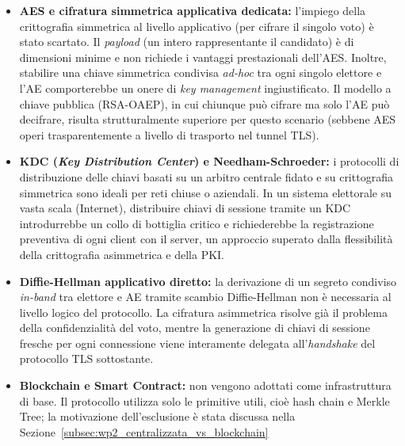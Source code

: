 \begin{itemize}
    \item \textbf{AES e cifratura simmetrica applicativa dedicata:} l'impiego della crittografia simmetrica al livello applicativo (per cifrare il singolo voto) è stato scartato. Il \textit{payload} (un intero rappresentante il candidato) è di dimensioni minime e non richiede i vantaggi prestazionali dell'AES. Inoltre, stabilire una chiave simmetrica condivisa \textit{ad-hoc} tra ogni singolo elettore e l'AE comporterebbe un onere di \textit{key management} ingiustificato. Il modello a chiave pubblica (RSA-OAEP), in cui chiunque può cifrare ma solo l'AE può decifrare, risulta strutturalmente superiore per questo scenario (sebbene AES operi trasparentemente a livello di trasporto nel tunnel TLS).
    \item \textbf{KDC (\textit{Key Distribution Center}) e Needham-Schroeder:} i protocolli di distribuzione delle chiavi basati su un arbitro centrale fidato e su crittografia simmetrica sono ideali per reti chiuse o aziendali. In un sistema elettorale su vasta scala (Internet), distribuire chiavi di sessione tramite un KDC introdurrebbe un collo di bottiglia critico e richiederebbe la registrazione preventiva di ogni client con il server, un approccio superato dalla flessibilità della crittografia asimmetrica e della PKI.
    \item \textbf{Diffie-Hellman applicativo diretto:} la derivazione di un segreto condiviso \textit{in-band} tra elettore e AE tramite scambio Diffie-Hellman non è necessaria al livello logico del protocollo. La cifratura asimmetrica risolve già il problema della confidenzialità del voto, mentre la generazione di chiavi di sessione fresche per ogni connessione viene interamente delegata all'\textit{handshake} del protocollo TLS sottostante.
    \item \textbf{Blockchain e Smart Contract:} non vengono adottati come infrastruttura di base. Il protocollo utilizza solo le primitive utili, cioè hash chain e Merkle Tree; la motivazione dell'esclusione è stata discussa nella Sezione~\ref{subsec:wp2_centralizzata_vs_blockchain}
\end{itemize}